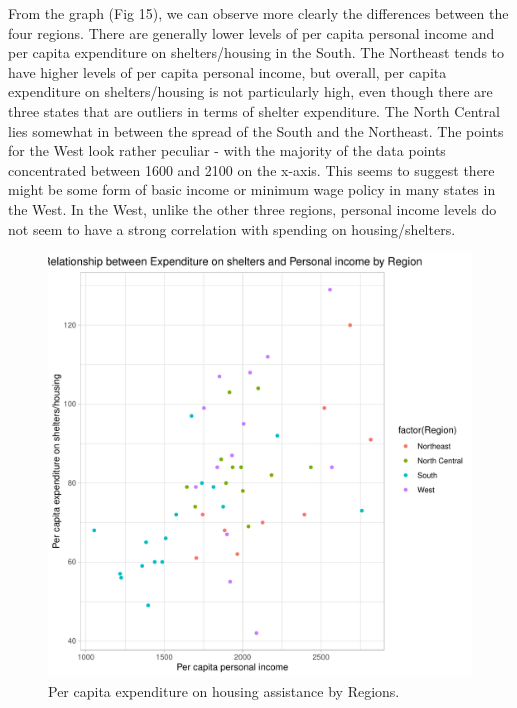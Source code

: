 \documentclass[12pt,letterpaper]{article}
\begin{document}
\begin{itemize}
\noindent From the graph (Fig 15), we can observe more clearly the differences between the four regions. There are generally lower levels of per capita personal income and per capita expenditure on shelters/housing in the South. The Northeast tends to have higher levels of per capita personal income, but overall, per capita expenditure on shelters/housing is not particularly high, even though there are three states that are outliers in terms of shelter expenditure. The North Central lies somewhat in between the spread of the South and the Northeast. The points for the West look rather peculiar - with the majority of the data points concentrated between 1600 and 2100 on the x-axis. This seems to suggest there might be some form of basic income or minimum wage policy in many states in the West. In the West, unlike the other three regions, personal income levels do not seem to have a strong correlation with spending on housing/shelters.\\

\begin{figure}[hbtp!]\centering
	\caption{\footnotesize Per capita expenditure on housing assistance by Regions.}
	\label{boxplot}
	\includegraphics[width=.75\textwidth]{plot_3_variables.pdf}
\end{figure}

\end{itemize}
\end{document}
